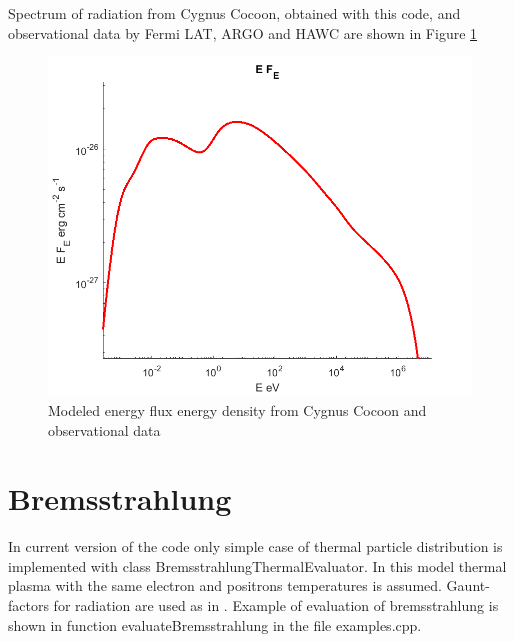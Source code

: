 Spectrum of radiation from Cygnus Cocoon, obtained with this code, and observational data by Fermi LAT, ARGO and HAWC \cite{Ackermann2011, Bartoli2014, Abeysekara2021} are shown in Figure \ref{pion}
\begin{figure}
	\centering
	\includegraphics[width=12.5 cm]{./fig/compton.png} 
	\caption{Modeled energy flux energy density from Cygnus Cocoon and observational data}
	\label{pion}
\end{figure}
\section{Bremsstrahlung}
In current version of the code only simple case of thermal particle distribution is implemented with class BremsstrahlungThermalEvaluator. In this model thermal plasma with the same electron and positrons temperatures is assumed. Gaunt-factors for radiation are used as in \cite{Rybicki}. Example of evaluation of bremsstrahlung is shown in function  evaluateBremsstrahlung in the file examples.cpp.
